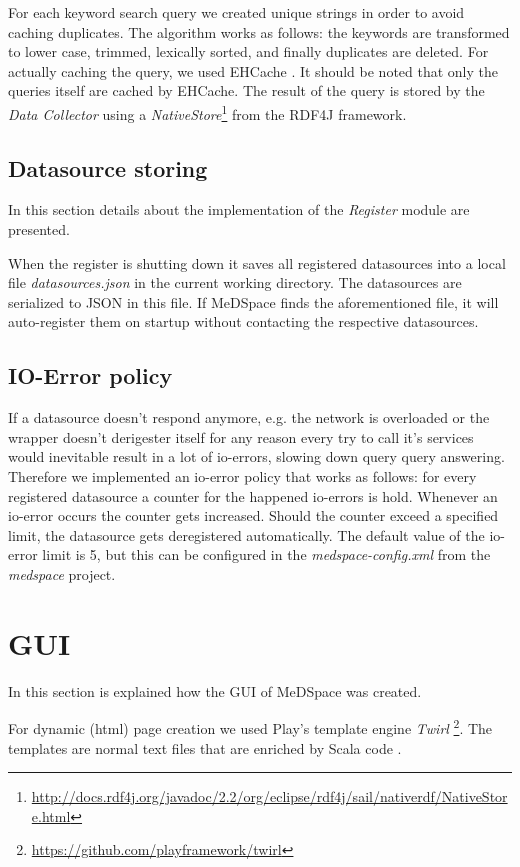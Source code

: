 For each keyword search query we created unique strings in order to avoid caching duplicates.
The algorithm works as follows: the keywords are transformed to lower case, trimmed, lexically sorted, and finally duplicates are deleted.
For actually caching the query, we used EHCache \cite{EHCache}. 
It should be noted that only the queries itself are cached by EHCache. The result of the query is stored by the \emph{Data Collector} using a \emph{NativeStore}\footnote{\url{http://docs.rdf4j.org/javadoc/2.2/org/eclipse/rdf4j/sail/nativerdf/NativeStore.html}} from the RDF4J framework.

\subsection{Datasource storing}
In this section details about the implementation of the \emph{Register} module are presented.

When the register is shutting down it saves all registered datasources into a local file \emph{datasources.json} in the current working directory. The datasources are serialized to JSON in this file. If MeDSpace finds the aforementioned file, it will auto-register them on startup without contacting the respective datasources.

\subsection{IO-Error policy}

If a datasource doesn't respond anymore, e.g. the network is overloaded or the wrapper doesn't derigester itself for any reason every try to call it's services would inevitable result in a lot of io-errors, slowing down query query answering. Therefore we implemented an io-error policy that works as follows: for every registered datasource a counter for the happened io-errors is hold. Whenever an io-error occurs the counter gets increased. Should the counter exceed a specified limit, the datasource gets deregistered automatically. The default value of the io-error limit is 5, but this can be configured in the \emph{medspace-config.xml} from the \emph{medspace} project.

\section{GUI}
In this section is explained how the GUI of MeDSpace was created.

For dynamic (html) page creation we used Play's template engine \emph{Twirl} \footnote{\url{https://github.com/playframework/twirl}}. The templates are normal text files that are enriched by Scala code \cite{PlayJavaTemplates}.

